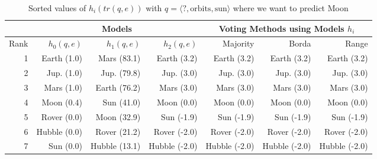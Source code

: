 \begin{table} 
\centering 
\begin{tabular}{r|r|r|r|r|r|r}
&\multicolumn{3}{|c|}{Models}&
\multicolumn{3}{|c}{Voting Methods using Models $h_i$}\\
 \hline 
Rank &$h_0(q, e)$ &$h_1(q, e)$ &$h_2(q, e)$ &Majority &Borda &Range\\
\hline
1 &Earth (1.0)&		Mars (83.1)&		Earth (3.2)&		Earth (3.2) &Earth (3.2) &Earth (3.2)\\
2 &Jup. (1.0)&		Jup. (79.8)&		Jup. (3.0)&		Jup. (3.0) &Jup. (3.0) &Jup. (3.0)\\
3 &Mars (1.0)&		Earth (76.2)&		Mars (3.0)&		Mars (3.0) &Mars (3.0) &Mars (3.0)\\
4 &Moon (0.4)&		Sun (41.0)&		Moon (0.0)&		Moon (0.0) &Moon (0.0) &Moon (0.0)\\
\hline \hline
5 &Rover (0.0)&		Moon (32.9)&		Sun (-1.9)&		Sun (-1.9) &Sun (-1.9) &Sun (-1.9)\\
6 &Hubble (0.0)&		Rover (21.2)&		Rover (-2.0)&		Rover (-2.0) &Rover (-2.0) &Rover (-2.0)\\
7 &Sun (0.0)&		Hubble (13.1)&		Hubble (-2.0)&		Hubble (-2.0) &Hubble (-2.0) &Hubble (-2.0)\\
\end{tabular}
\caption{Sorted values of $h_i(tr(q,e))$ with $q=\langle ?, \text{orbits}, \text{sun} \rangle$ where we want to predict Moon}
\end{table}